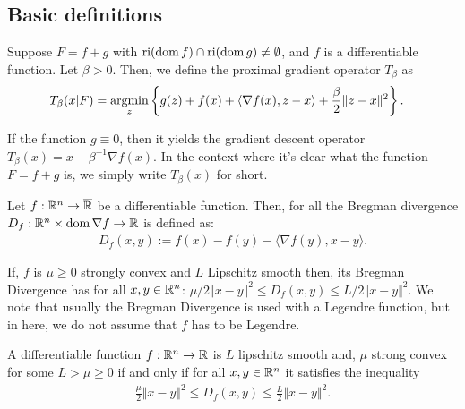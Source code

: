 \documentclass[12pt]{article}
\begin{document}
    \subsection{Basic definitions}
        \begin{definition}\label{def:pg-opt}
            Suppose $F = f + g$ with $\operatorname{ri}(\operatorname{dom} f) \cap \operatorname{ri}(\operatorname{dom} g) \neq \emptyset$, and $f$ is a differentiable function. 
            Let $\beta > 0$. 
            Then, we define the proximal gradient operator $T_{\beta}$ as 
            \begin{align*}
                T_\beta (x | F) &= \mathop{\rm argmin}\limits_{z} \left\lbrace
                    g(z) + f(x) + \langle \nabla f(x), z - x\rangle + \frac{\beta}{2}\Vert z - x\Vert^2
                \right\rbrace. 
            \end{align*}
        \end{definition}
        \begin{remark}
            If the function $g \equiv 0$, then it yields the gradient descent operator $T_\beta(x) = x - \beta^{-1}\nabla f(x)$. 
            In the context where it's clear what the function $F = f + g$ is, we simply write $T_\beta(x)$ for short. 
        \end{remark}
        \begin{definition}
            Let $f:\mathbb R^n \rightarrow \overline {\mathbb R}$ be a differentiable function. 
            Then, for all the Bregman divergence $D_f: \mathbb R^n \times \operatorname{dom}\nabla f \rightarrow \mathbb R$ is defined as: 
            \begin{align*}
                D_f(x, y) := f(x) - f(y) - \langle \nabla f(y), x - y\rangle. 
            \end{align*}
        \end{definition}
        \begin{remark}
            If, $f$ is $\mu \ge 0$ strongly convex and $L$ Lipschitz smooth then, its Bregman Divergence has for all $x, y \in \mathbb R^n$: $\mu/2 \Vert x - y\Vert^2 \le D_f(x, y) \le L/2 \Vert x - y\Vert^2$. 
            We note that usually the Bregman Divergence is used with a Legendre function, but in here, we do not assume that $f$ has to be Legendre. 
        \end{remark}
        \begin{definition}\label{def:lip-smooth-and-scnvx}
            A differentiable function $f: \mathbb R^n \rightarrow \mathbb R$ is $L$ lipschitz smooth and, $\mu$ strong convex for some $L > \mu \ge 0$ if and only if for all $x, y \in \mathbb R^n$ it satisfies the inequality 
            \begin{align*}
                \frac{\mu}{2}\Vert x - y\Vert^2 \le D_f(x, y) \le \frac{L}{2}\Vert x - y\Vert^2. 
            \end{align*}
        \end{definition}
\end{document}
